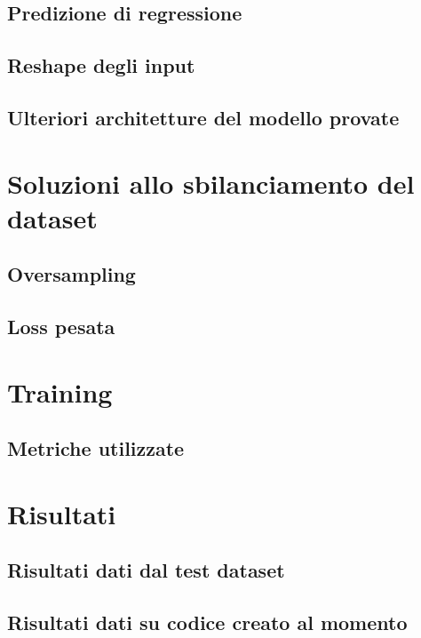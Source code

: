 \subsection{Predizione di regressione}


\subsection{Reshape degli input}

\subsection{Ulteriori architetture del modello provate}


\section{Soluzioni allo sbilanciamento del dataset}
    \subsection{Oversampling}
    \subsection{Loss pesata}
\section{Training}
\subsection{Metriche utilizzate}

\section{Risultati}
\subsection{Risultati dati dal test dataset}
\subsection{Risultati dati su codice creato al momento}